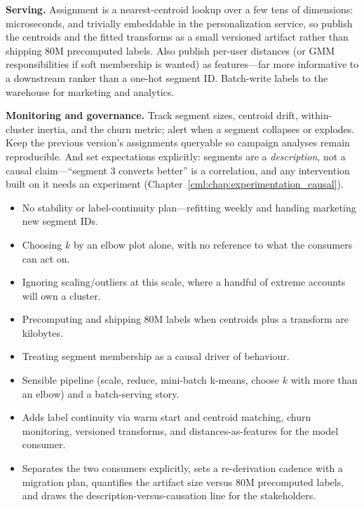 \begin{interviewq}
\textbf{Serving.} Assignment is a nearest-centroid lookup over a few tens of dimensions: microseconds, and trivially embeddable in the personalization service, so publish the centroids and the fitted transforms as a small versioned artifact rather than shipping 80M precomputed labels. Also publish per-user distances (or GMM responsibilities if soft membership is wanted) as features---far more informative to a downstream ranker than a one-hot segment ID. Batch-write labels to the warehouse for marketing and analytics.

\textbf{Monitoring and governance.} Track segment sizes, centroid drift, within-cluster inertia, and the churn metric; alert when a segment collapses or explodes. Keep the previous version's assignments queryable so campaign analyses remain reproducible. And set expectations explicitly: segments are a \emph{description}, not a causal claim---``segment 3 converts better'' is a correlation, and any intervention built on it needs an experiment (Chapter~\ref{cml:chap:experimentation_causal}).

\redflags
\begin{itemize}
    \item No stability or label-continuity plan---refitting weekly and handing marketing new segment IDs.
    \item Choosing $k$ by an elbow plot alone, with no reference to what the consumers can act on.
    \item Ignoring scaling/outliers at this scale, where a handful of extreme accounts will own a cluster.
    \item Precomputing and shipping 80M labels when centroids plus a transform are kilobytes.
    \item Treating segment membership as a causal driver of behaviour.
\end{itemize}


\goodgreat
\begin{itemize}
    \item {} Sensible pipeline (scale, reduce, mini-batch k-means, choose $k$ with more than an elbow) and a batch-serving story.
    \item {} Adds label continuity via warm start and centroid matching, churn monitoring, versioned transforms, and distances-as-features for the model consumer.
    \item {} Separates the two consumers explicitly, sets a re-derivation cadence with a migration plan, quantifies the artifact size versus 80M precomputed labels, and draws the description-versus-causation line for the stakeholders.
\end{itemize}

\end{interviewq}
